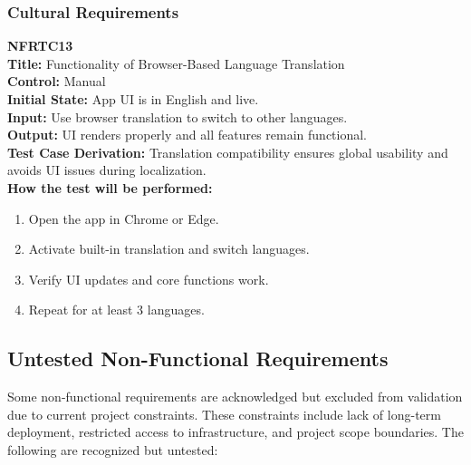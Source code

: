 \documentclass[12pt, titlepage]{article}
\begin{document}
\vspace{1em}
\subsubsection{Cultural Requirements}

\textbf{NFRTC13}\\
\textbf{Title:} Functionality of Browser-Based Language Translation\\
\textbf{Control:} Manual\\
\textbf{Initial State:} App UI is in English and live.\\
\textbf{Input:} Use browser translation to switch to other languages.\\
\textbf{Output:} UI renders properly and all features remain functional.\\
\textbf{Test Case Derivation:} Translation compatibility ensures global usability and avoids UI issues during localization.\\
\textbf{How the test will be performed:}
\begin{enumerate}
  \item Open the app in Chrome or Edge.
  \item Activate built-in translation and switch languages.
  \item Verify UI updates and core functions work.
  \item Repeat for at least 3 languages.
\end{enumerate}


\subsection{Untested Non-Functional Requirements}


Some non-functional requirements are acknowledged but excluded from validation due to current project constraints. These constraints include lack of long-term deployment, restricted access to infrastructure, and project scope boundaries. The following are recognized but untested:
\end{document}
